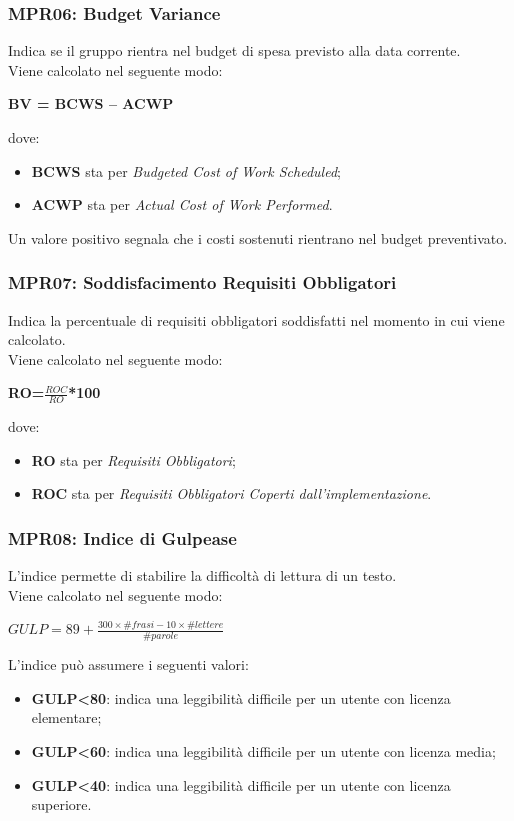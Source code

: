 \subsubsection{MPR06: Budget Variance}
Indica se il gruppo rientra nel budget di spesa previsto alla data corrente.\\
Viene calcolato nel seguente modo:
\begin{center}
	\textbf{BV = BCWS – ACWP}
\end{center}
dove:
\begin{itemize}
	\item \textbf{BCWS} sta per \textit{Budgeted Cost of Work Scheduled};
	\item \textbf{ACWP} sta per \textit{Actual Cost of Work Performed}.
\end{itemize}
Un valore positivo segnala che i costi sostenuti rientrano nel budget preventivato.
\subsubsection{MPR07: Soddisfacimento Requisiti Obbligatori}
Indica la percentuale di requisiti obbligatori soddisfatti nel momento in cui viene calcolato.\\
Viene calcolato nel seguente modo:
\begin{center}
	\textbf{RO=\(\frac{ROC}{RO}\)*100}
\end{center}
dove:
\begin{itemize}
	\item \textbf{RO} sta per \textit{Requisiti Obbligatori};
	\item \textbf{ROC} sta per \textit{Requisiti Obbligatori Coperti dall'implementazione}.
\end{itemize}
\subsubsection{MPR08: Indice di Gulpease}
L'indice permette di stabilire la difficoltà di lettura di un testo.\\
Viene calcolato nel seguente modo:
\begin{center}
	\(
	GULP = 89+\frac{300\times\# frasi-10\times\#lettere}{\#parole}
	\)
\end{center}
L'indice può assumere i seguenti valori:
\begin{itemize}
	\item \textbf{GULP<80}: indica una leggibilità difficile per un utente con licenza elementare;
	\item \textbf{GULP<60}: indica una leggibilità difficile per un utente con licenza media;
	\item \textbf{GULP<40}: indica una leggibilità difficile per un utente con licenza superiore.
\end{itemize}
